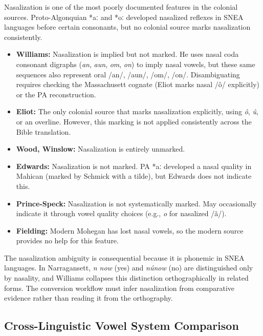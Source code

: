 Nasalization is one of the most poorly documented features in the colonial
sources. Proto-Algonquian *aː and *oː developed nasalized reflexes in SNEA
languages before certain consonants, but no colonial source marks
nasalization consistently.

\begin{itemize}
  \item \textbf{Williams:} Nasalization is implied but not marked. He uses
    nasal coda consonant digraphs (\textit{an}, \textit{aun}, \textit{om},
    \textit{on}) to imply nasal vowels, but these same sequences also
    represent oral /an/, /aun/, /om/, /on/. Disambiguating requires
    checking the Massachusett cognate (Eliot marks nasal /ô/ explicitly) or
    the PA reconstruction.

  \item \textbf{Eliot:} The only colonial source that marks nasalization
    explicitly, using \textit{ô}, \textit{û}, or an overline. However, this
    marking is not applied consistently across the Bible translation.

  \item \textbf{Wood, Winslow:} Nasalization is entirely unmarked.

  \item \textbf{Edwards:} Nasalization is not marked. PA *aː developed a
    nasal quality in Mahican (marked by Schmick with a tilde), but Edwards
    does not indicate this.

  \item \textbf{Prince-Speck:} Nasalization is not systematically marked.
    May occasionally indicate it through vowel quality choices (e.g.,
    \textit{o} for nasalized /ã/).

  \item \textbf{Fielding:} Modern Mohegan has lost nasal vowels, so the
    modern source provides no help for this feature.
\end{itemize}

The nasalization ambiguity is consequential because it is phonemic in SNEA
languages. In Narragansett, \textit{n now} (yes) and \textit{núnow} (no) are
distinguished only by nasality, and Williams collapses this distinction
orthographically in related forms. The conversion workflow must infer
nasalization from comparative evidence rather than reading it from the
orthography.

\subsection{Cross-Linguistic Vowel System Comparison}

